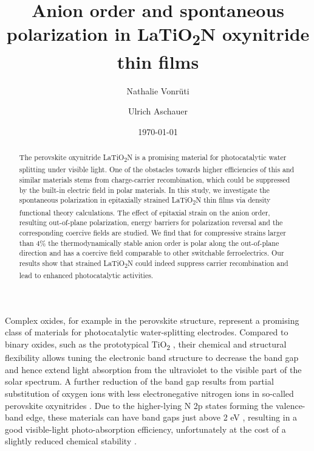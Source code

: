 \documentclass[prl,reprint,aps,twocolumn]{revtex4-1}
\begin{document}
\title{Anion order and spontaneous polarization in LaTiO\textsubscript{2}N oxynitride thin films}
\date{\today}
\author{Nathalie Vonr\"uti}
\author{Ulrich Aschauer}

\begin{abstract}
The perovskite oxynitride LaTiO\textsubscript{2}N is a promising material for photocatalytic water splitting under visible light. 
One of the obstacles towards higher efficiencies of this and similar materials stems from charge-carrier recombination, which could be suppressed by the built-in electric field in polar materials. In this study, we investigate the spontaneous polarization in epitaxially 
strained LaTiO\textsubscript{2}N thin films via density functional theory calculations. The effect of epitaxial strain on the anion order, resulting out-of-plane polarization, 
energy barriers for polarization reversal and the corresponding coercive fields are studied. We find that for compressive strains larger than 4\% the thermodynamically stable anion order is polar along the 
out-of-plane direction and has a coercive field comparable to other switchable ferroelectrics. Our results show that 
strained LaTiO\textsubscript{2}N could indeed suppress carrier recombination and lead to enhanced photocatalytic activities.
\end{abstract}

\maketitle
Complex oxides, for example in the perovskite structure, represent a promising class of materials for photocatalytic water-splitting electrodes. 
Compared to binary oxides, such as the prototypical TiO\textsubscript{2} \cite{fujishima1972electrochemical}, their chemical and structural flexibility 
allows tuning the electronic band structure to decrease the band gap and hence extend light absorption from the ultraviolet to the visible part of the solar spectrum. 
A further reduction of the band gap results from partial substitution of oxygen ions 
with less electronegative nitrogen ions in so-called perovskite oxynitrides \cite{ebbinghaus2009perovskite, takata2015recent, ahmed2016review, wu2013first, castelli2012new}. 
Due to the higher-lying N 2p states forming the valence-band edge, these materials can have band gaps just above 2 eV \cite{Kasahara:2002kd}, resulting in a good visible-light photo-absorption efficiency, 
unfortunately at the cost of a slightly reduced chemical stability \cite{Fuertes2010}. 
\end{document}
